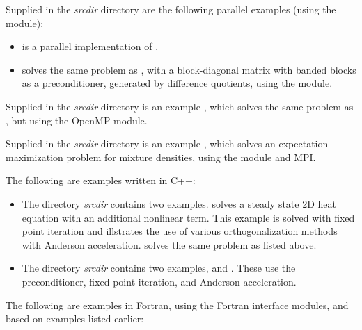 \vspace{0.2in}\noindent
Supplied in the {\em srcdir} directory are
the following parallel examples (using the {\nvecp} module):
\begin{itemize}
\item {}
  is a parallel implementation of .
\item {}
  solves the same problem as , with a block-diagonal matrix
  with banded blocks as a preconditioner, generated by difference quotients,
  using the {\kinbbdpre} module.
\end{itemize}

\vspace{0.2in}\noindent
Supplied in the {\em srcdir} directory
is an example , which solves the same problem
as , but using the OpenMP {\nvector} module.

\vspace{0.2in}\noindent
Supplied in the {\em srcdir} directory
is an example , which solves an
expectation-maximization problem for mixture densities, using the
 {\nvector} module and MPI.

\vspace{0.2in}\noindent 
The following are examples written in C++:
\begin{itemize}

\item The directory {\em srcdir}
  contains two examples.  solves a
  steady state 2D heat equation with an additional nonlinear term.
  This example is solved with fixed point iteration and illstrates
  the use of various orthogonalization methods with Anderson
  acceleration.
   solves the same problem as 
  listed above.

\item The directory {\em srcdir}
  contains two examples,  and
  .  These use the 
   preconditioner, fixed point iteration, and Anderson
  acceleration.

\end{itemize}
  
\vspace{0.2in}\noindent
The following are examples in Fortran, using the {\sundials}
Fortran interface modules, and based on examples listed earlier:


